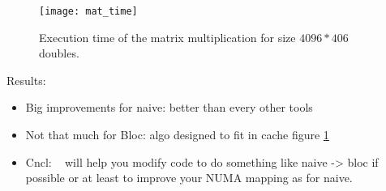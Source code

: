 \begin{figure}[htb]
    \centering
    \texttt{[image: mat\_time]}
    \caption{Execution time of the matrix multiplication for size $4096*406$ doubles.}
    \label{fig:matrix-res}
\end{figure}

Results:
\begin{itemize}
    \item Big improvements for naive: better than every other tools
    \item Not that much for Bloc: algo designed to fit in cache figure
        \ref{fig:matrix-res}
    \item Cncl: \TABARNAC~ will help you modify code to do something like naive
        -> bloc if possible or at least to improve your NUMA mapping as for
        naive.
\end{itemize}

